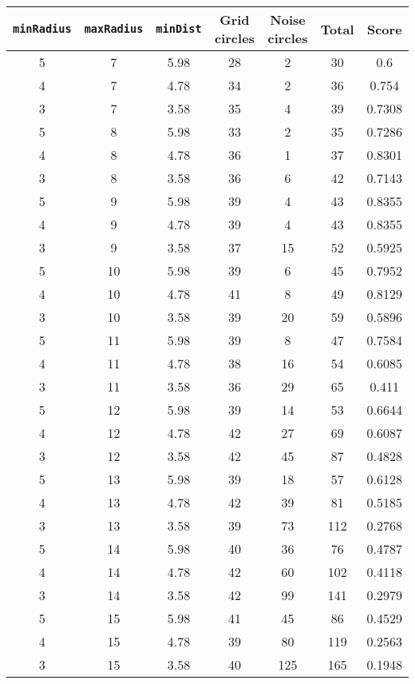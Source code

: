 \documentclass[letterpaper, 12pt]{article}
\begin{document}
\begin{longtable}{|c|c|c|c|c|c|c|}
\hline
\textbf{\texttt{minRadius}} & \textbf{\texttt{maxRadius}} & \textbf{\texttt{minDist}} & \textbf{Grid circles} & \textbf{Noise circles} & \textbf{Total} & \textbf{Score} \\
\hline
5 & 7 & 5.98 & 28 & 2 & 30 & 0.6 \\
\hline
4 & 7 & 4.78 & 34 & 2 & 36 & 0.754 \\
\hline
3 & 7 & 3.58 & 35 & 4 & 39 & 0.7308 \\
\hline
5 & 8 & 5.98 & 33 & 2 & 35 & 0.7286 \\
\hline
4 & 8 & 4.78 & 36 & 1 & 37 & 0.8301 \\
\hline
3 & 8 & 3.58 & 36 & 6 & 42 & 0.7143 \\
\hline
5 & 9 & 5.98 & 39 & 4 & 43 & 0.8355 \\
\hline
4 & 9 & 4.78 & 39 & 4 & 43 & 0.8355 \\
\hline
3 & 9 & 3.58 & 37 & 15 & 52 & 0.5925 \\
\hline
5 & 10 & 5.98 & 39 & 6 & 45 & 0.7952 \\
\hline
4 & 10 & 4.78 & 41 & 8 & 49 & 0.8129 \\
\hline
3 & 10 & 3.58 & 39 & 20 & 59 & 0.5896 \\
\hline
5 & 11 & 5.98 & 39 & 8 & 47 & 0.7584 \\
\hline
4 & 11 & 4.78 & 38 & 16 & 54 & 0.6085 \\
\hline
3 & 11 & 3.58 & 36 & 29 & 65 & 0.411 \\
\hline
5 & 12 & 5.98 & 39 & 14 & 53 & 0.6644 \\
\hline
4 & 12 & 4.78 & 42 & 27 & 69 & 0.6087 \\
\hline
3 & 12 & 3.58 & 42 & 45 & 87 & 0.4828 \\
\hline
5 & 13 & 5.98 & 39 & 18 & 57 & 0.6128 \\
\hline
4 & 13 & 4.78 & 42 & 39 & 81 & 0.5185 \\
\hline
3 & 13 & 3.58 & 39 & 73 & 112 & 0.2768 \\
\hline
5 & 14 & 5.98 & 40 & 36 & 76 & 0.4787 \\
\hline
4 & 14 & 4.78 & 42 & 60 & 102 & 0.4118 \\
\hline
3 & 14 & 3.58 & 42 & 99 & 141 & 0.2979 \\
\hline
5 & 15 & 5.98 & 41 & 45 & 86 & 0.4529 \\
\hline
4 & 15 & 4.78 & 39 & 80 & 119 & 0.2563 \\
\hline
3 & 15 & 3.58 & 40 & 125 & 165 & 0.1948 \\

\end{longtable}
\end{document}
